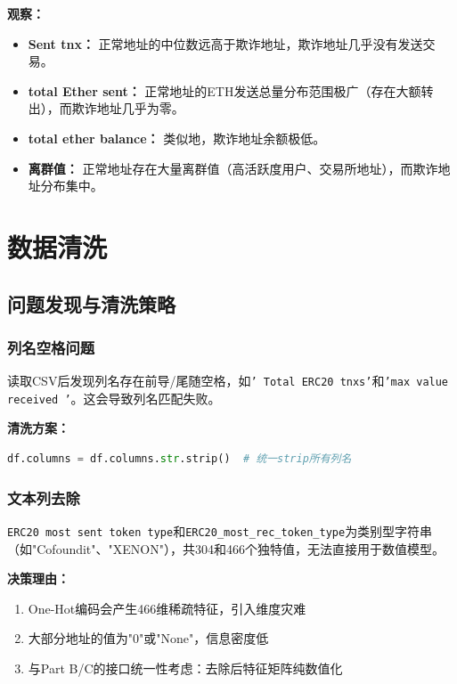 \documentclass[12pt,a4paper]{article}
\begin{document}
\textbf{观察：}
\begin{itemize}
    \item \textbf{Sent tnx：} 正常地址的中位数远高于欺诈地址，欺诈地址几乎没有发送交易。
    \item \textbf{total Ether sent：} 正常地址的ETH发送总量分布范围极广（存在大额转出），而欺诈地址几乎为零。
    \item \textbf{total ether balance：} 类似地，欺诈地址余额极低。
    \item \textbf{离群值：} 正常地址存在大量离群值（高活跃度用户、交易所地址），而欺诈地址分布集中。
\end{itemize}

\section{数据清洗}

\subsection{问题发现与清洗策略}

\subsubsection{列名空格问题}

读取CSV后发现列名存在前导/尾随空格，如\texttt{' Total ERC20 tnxs'}和\texttt{'max value received '}。这会导致列名匹配失败。

\textbf{清洗方案：}
\begin{lstlisting}[language=Python]
df.columns = df.columns.str.strip()  # 统一strip所有列名
\end{lstlisting}

\subsubsection{文本列去除}

\texttt{ERC20 most sent token type}和\texttt{ERC20\_most\_rec\_token\_type}为类别型字符串（如"Cofoundit"、"XENON"），共304和466个独特值，无法直接用于数值模型。

\textbf{决策理由：}
\begin{enumerate}
    \item One-Hot编码会产生466维稀疏特征，引入维度灾难
    \item 大部分地址的值为"0"或"None"，信息密度低
    \item 与Part B/C的接口统一性考虑：去除后特征矩阵纯数值化
\end{enumerate}
\end{document}
